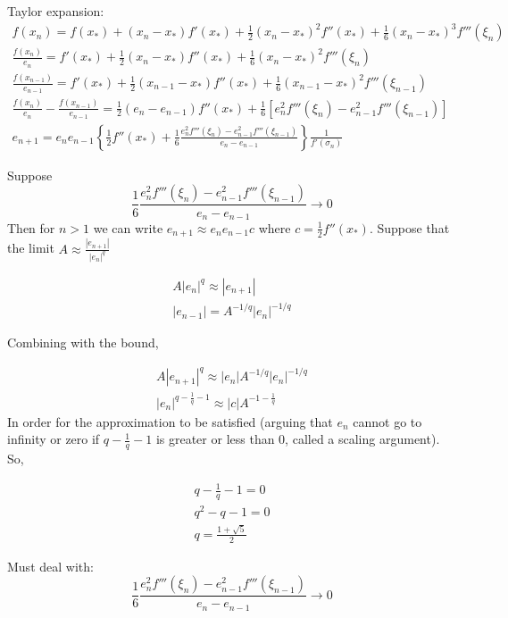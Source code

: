 Taylor expansion:
\begin{align}
    f(x_n) = f(x_*) + (x_n -x_*) f'(x_*) + \frac{1}{2} (x_n-x_*)^2 f''(x_*) + \frac{1}{6} (x_n-x_*)^3f'''(\xi_n)\\
    \frac{f(x_n)}{e_n}= f'(x_*) + \frac{1}{2} (x_n-x_*) f''(x_*) + \frac{1}{6} (x_n-x_*)^2f'''(\xi_n) \\ 
    \frac{f(x_{n-1})}{e_{n-1}}= f'(x_*) + \frac{1}{2} (x_{n-1}-x_*) f''(x_*) + \frac{1}{6} (x_{n-1}-x_*)^2f'''(\xi_{n-1}) \\ 
    \frac{f(x_{n})}{e_{n}} - \frac{f(x_{n-1})}{e_{n-1}}= \frac{1}{2}(e_n - e_{n-1}) f''(x_*) + \frac{1}{6} \left[e_n^2f'''(\xi_{n}) - e_{n-1}^2f'''(\xi_{n-1})\right] \\ 
    e_{n+1}= e_ne_{n-1}\left\{ \frac{1}{2}f''(x_*) + \frac{1}{6} \frac{e_n^2f'''(\xi_{n}) - e_{n-1}^2f'''(\xi_{n-1})}{e_n - e_{n-1}}\right\} \frac{1}{f'(\sigma_n)}
\end{align}

Suppose 
\[\frac{1}{6} \frac{e_n^2f'''(\xi_{n}) - e_{n-1}^2f'''(\xi_{n-1})}{e_n - e_{n-1}} \rightarrow 0\]
Then for $n>1$ we can write $e_{n+1} \approx e_ne_{n-1}c$ where $c=\frac{1}{2}f''(x_*)$. Suppose that the limit $A \approx \frac{|e_{n+1}|}{|e_n|^q} $

\begin{align}
    A{|e_n|}^q \approx |e_{n+1}|\\
    |e_{n-1}| = A^{-1/q}|e_n|^{-1/q}
\end{align}

Combining with the bound,

\begin{align}
    A|e_{n+1}|^q \approx |e_n| A^{-1/q}|e_n|^{-1/q}\\
    |e_n|^{q-\frac{1}{q}-1}\approx |c|A^{-1-\frac{1}{q}}
\end{align}
 In order for the approximation to be satisfied (arguing that $e_n$ cannot go to infinity or zero if $q-\frac{1}{q}-1$ is greater or less than 0, called a scaling argument). So,

 \begin{align}
     q-\frac{1}{q}-1 = 0 \\
     q^2-q-1=0\\
     q= \frac{1+\sqrt 5}{2}
 \end{align}

 Must deal with:
\[\frac{1}{6} \frac{e_n^2f'''(\xi_{n}) - e_{n-1}^2f'''(\xi_{n-1})}{e_n - e_{n-1}} \rightarrow 0\]

